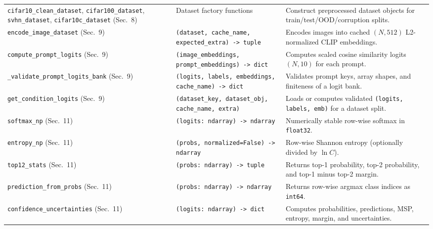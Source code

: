 \documentclass[11pt,a4paper]{article}
\begin{document}
\begin{small}
\begin{longtable}{L{0.29\textwidth} L{0.26\textwidth} L{0.36\textwidth}}
\texttt{cifar10\_\allowbreak{}clean\_\allowbreak{}dataset}, \texttt{cifar100\_\allowbreak{}dataset}, \texttt{svhn\_\allowbreak{}dataset}, \texttt{cifar10c\_\allowbreak{}dataset} (Sec.~8) & Dataset factory functions & Construct preprocessed dataset objects for train/test/OOD/corruption splits. \\
\texttt{encode\_\allowbreak{}image\_\allowbreak{}dataset} (Sec.~9) & \texttt{(\allowbreak{}dataset,\allowbreak{} cache\_\allowbreak{}name,\allowbreak{} expected\_\allowbreak{}extra) -> tuple} & Encodes images into cached $(N, 512)$ L2-normalized CLIP embeddings. \\
\texttt{compute\_\allowbreak{}prompt\_\allowbreak{}logits} (Sec.~9) & \texttt{(\allowbreak{}image\_\allowbreak{}embeddings,\allowbreak{} prompt\_\allowbreak{}embeddings) -> dict} & Computes scaled cosine similarity logits $(N, 10)$ for each prompt. \\
\texttt{\_\allowbreak{}validate\_\allowbreak{}prompt\_\allowbreak{}logits\_\allowbreak{}bank} (Sec.~9) & \texttt{(\allowbreak{}logits,\allowbreak{} labels,\allowbreak{} embeddings,\allowbreak{} cache\_\allowbreak{}name) -> dict} & Validates prompt keys, array shapes, and finiteness of a logit bank. \\
\texttt{get\_\allowbreak{}condition\_\allowbreak{}logits} (Sec.~9) & \texttt{(\allowbreak{}dataset\_\allowbreak{}key,\allowbreak{} dataset\_\allowbreak{}obj,\allowbreak{} cache\_\allowbreak{}name,\allowbreak{} extra)} & Loads or computes validated \texttt{(\allowbreak{}logits,\allowbreak{} labels,\allowbreak{} emb)} for a dataset split. \\
\texttt{softmax\_\allowbreak{}np} (Sec.~11) & \texttt{(\allowbreak{}logits: ndarray) -> ndarray} & Numerically stable row-wise softmax in \texttt{float32}. \\
\texttt{entropy\_\allowbreak{}np} (Sec.~11) & \texttt{(\allowbreak{}probs,\allowbreak{} normalized=False) -> ndarray} & Row-wise Shannon entropy (optionally divided by $\ln C$). \\
\texttt{top12\_\allowbreak{}stats} (Sec.~11) & \texttt{(\allowbreak{}probs: ndarray) -> tuple} & Returns top-1 probability, top-2 probability, and top-1 minus top-2 margin. \\
\texttt{prediction\_\allowbreak{}from\_\allowbreak{}probs} (Sec.~11) & \texttt{(\allowbreak{}probs: ndarray) -> ndarray} & Returns row-wise argmax class indices as \texttt{int64}. \\
\texttt{confidence\_\allowbreak{}uncertainties} (Sec.~11) & \texttt{(\allowbreak{}logits: ndarray) -> dict} & Computes probabilities, predictions, MSP, entropy, margin, and uncertainties. \\

\end{longtable}
\end{small}
\end{document}
